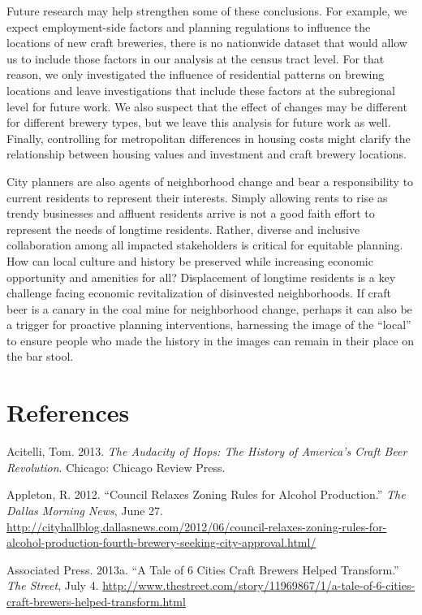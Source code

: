 \documentclass[]{article}
\begin{document}
Future research may help strengthen some of these conclusions. For
example, we expect employment-side factors and planning regulations to
influence the locations of new craft breweries, there is no nationwide
dataset that would allow us to include those factors in our analysis at
the census tract level. For that reason, we only investigated the
influence of residential patterns on brewing locations and leave
investigations that include these factors at the subregional level for
future work. We also suspect that the effect of changes may be different
for different brewery types, but we leave this analysis for future work
as well. Finally, controlling for metropolitan differences in housing
costs might clarify the relationship between housing values and
investment and craft brewery locations.

City planners are also agents of neighborhood change and bear a
responsibility to current residents to represent their interests. Simply
allowing rents to rise as trendy businesses and affluent residents
arrive is not a good faith effort to represent the needs of longtime
residents. Rather, diverse and inclusive collaboration among all
impacted stakeholders is critical for equitable planning. How can local
culture and history be preserved while increasing economic opportunity
and amenities for all? Displacement of longtime residents is a key
challenge facing economic revitalization of disinvested neighborhoods.
If craft beer is a canary in the coal mine for neighborhood change,
perhaps it can also be a trigger for proactive planning interventions,
harnessing the image of the ``local'' to ensure people who made the
history in the images can remain in their place on the bar stool.

\clearpage
\newpage
\section{References}\label{references}

Acitelli, Tom. 2013. \emph{The Audacity of Hops: The History of
America's Craft Beer Revolution}. Chicago: Chicago Review Press.

Appleton, R. 2012. ``Council Relaxes Zoning Rules for Alcohol
Production.'' \emph{The Dallas Morning News}, June 27.
\url{http://cityhallblog.dallasnews.com/2012/06/council-relaxes-zoning-rules-for-alcohol-production-fourth-brewery-seeking-city-approval.html/}

Associated Press. 2013a. ``A Tale of 6 Cities Craft Brewers Helped
Transform.'' \emph{The Street}, July 4.
\url{http://www.thestreet.com/story/11969867/1/a-tale-of-6-cities-craft-brewers-helped-transform.html}
\end{document}
